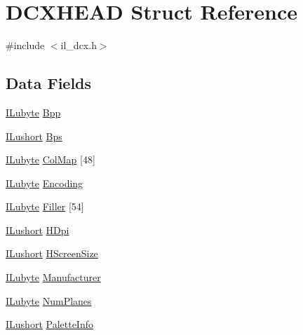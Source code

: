 \hypertarget{struct_d_c_x_h_e_a_d}{\section{D\-C\-X\-H\-E\-A\-D Struct Reference}
\label{struct_d_c_x_h_e_a_d}
}


{\ttfamily \#include $<$il\-\_\-dcx.\-h$>$}

\subsection*{Data Fields}
\begin{DoxyCompactItemize}
\item 
\hyperlink{il_8h_a8d2f04500100a86d1b00e98ab1b15a33}{I\-Lubyte} \hyperlink{struct_d_c_x_h_e_a_d_acb619433784a0e26c0f1f18b3700c9f7}{Bpp}
\item 
\hyperlink{il_8h_af6287b43748354a7c4864da43ae56962}{I\-Lushort} \hyperlink{struct_d_c_x_h_e_a_d_ae2dd397acb50561de43449bb5a821c6b}{Bps}
\item 
\hyperlink{il_8h_a8d2f04500100a86d1b00e98ab1b15a33}{I\-Lubyte} \hyperlink{struct_d_c_x_h_e_a_d_ac8fb105fe120691046611cd184216e47}{Col\-Map} \mbox{[}48\mbox{]}
\item 
\hyperlink{il_8h_a8d2f04500100a86d1b00e98ab1b15a33}{I\-Lubyte} \hyperlink{struct_d_c_x_h_e_a_d_a1b56e939de903a966230c1ee857413d5}{Encoding}
\item 
\hyperlink{il_8h_a8d2f04500100a86d1b00e98ab1b15a33}{I\-Lubyte} \hyperlink{struct_d_c_x_h_e_a_d_a5197893736337c3eba3e905a1a3b2a5b}{Filler} \mbox{[}54\mbox{]}
\item 
\hyperlink{il_8h_af6287b43748354a7c4864da43ae56962}{I\-Lushort} \hyperlink{struct_d_c_x_h_e_a_d_aca4eb1e4fd89f3665d1b8c76bd938932}{H\-Dpi}
\item 
\hyperlink{il_8h_af6287b43748354a7c4864da43ae56962}{I\-Lushort} \hyperlink{struct_d_c_x_h_e_a_d_a83464d22a2cd215689ec98bd2bf5ba4c}{H\-Screen\-Size}
\item 
\hyperlink{il_8h_a8d2f04500100a86d1b00e98ab1b15a33}{I\-Lubyte} \hyperlink{struct_d_c_x_h_e_a_d_a3b6d4abc3f4c8f441294ca13f670c5ea}{Manufacturer}
\item 
\hyperlink{il_8h_a8d2f04500100a86d1b00e98ab1b15a33}{I\-Lubyte} \hyperlink{struct_d_c_x_h_e_a_d_aae7ec9640632bcd0399af1026799dc7f}{Num\-Planes}
\item 
\hyperlink{il_8h_af6287b43748354a7c4864da43ae56962}{I\-Lushort} \hyperlink{struct_d_c_x_h_e_a_d_aa13262352c485f187f819a03b7eca3e9}{Palette\-Info}

\end{DoxyCompactItemize}
